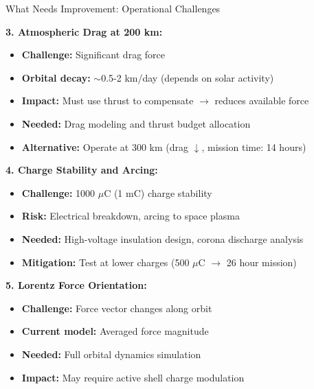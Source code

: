 \documentclass[11pt]{beamer}
\begin{document}
\begin{frame}{What Needs Improvement: Operational Challenges}

\textbf{3. Atmospheric Drag at 200 km:}
\begin{itemize}
\item \textbf{Challenge:} Significant drag force
\item \textbf{Orbital decay:} $\sim$0.5-2 km/day (depends on solar activity)
\item \textbf{Impact:} Must use thrust to compensate $\rightarrow$ reduces available force
\item \textbf{Needed:} Drag modeling and thrust budget allocation
\item \textbf{Alternative:} Operate at 300 km (drag $\downarrow$, mission time: 14 hours)
\end{itemize}

\vspace{0.2cm}

\textbf{4. Charge Stability and Arcing:}
\begin{itemize}
\item \textbf{Challenge:} 1000 $\mu$C (1 mC) charge stability
\item \textbf{Risk:} Electrical breakdown, arcing to space plasma
\item \textbf{Needed:} High-voltage insulation design, corona discharge analysis
\item \textbf{Mitigation:} Test at lower charges (500 $\mu$C $\rightarrow$ 26 hour mission)
\end{itemize}

\vspace{0.2cm}

\textbf{5. Lorentz Force Orientation:}
\begin{itemize}
\item \textbf{Challenge:} Force vector changes along orbit
\item \textbf{Current model:} Averaged force magnitude
\item \textbf{Needed:} Full orbital dynamics simulation
\item \textbf{Impact:} May require active shell charge modulation
\end{itemize}

\end{frame}
\end{document}
